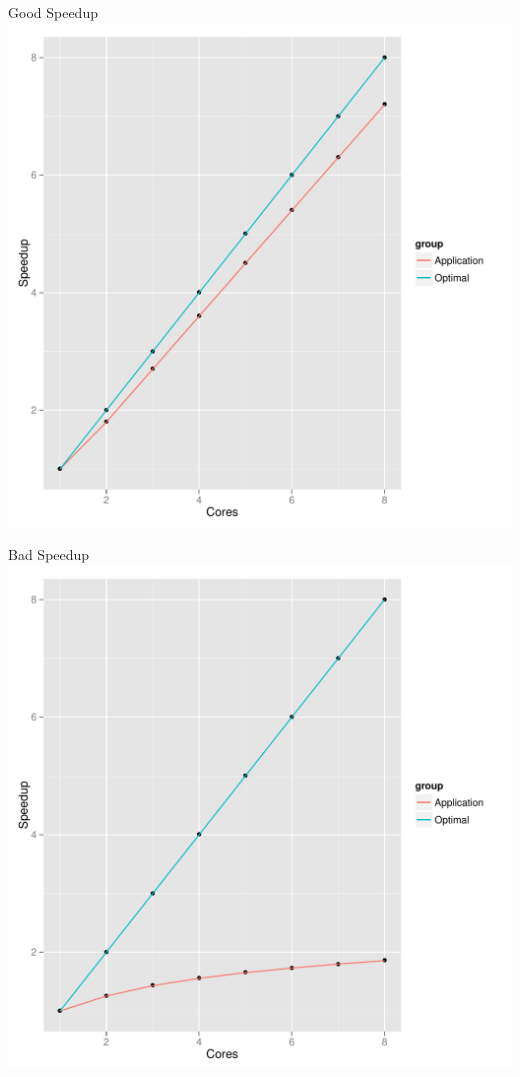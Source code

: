 \begin{frame}
   \begin{center}
    \begin{minipage}{.475\textwidth}
    \begin{block}{Good Speedup}
      \centering
      \includegraphics[width=.95\textwidth]{../common/pics/scale_good}
    \end{block}
    \end{minipage}
    \hspace{.1cm}
    \begin{minipage}{.475\textwidth}
    \begin{block}{Bad Speedup}
      \centering
      \includegraphics[width=.95\textwidth]{../common/pics/scale_bad}
    \end{block}
    \end{minipage}
    \end{center}
\end{frame}


